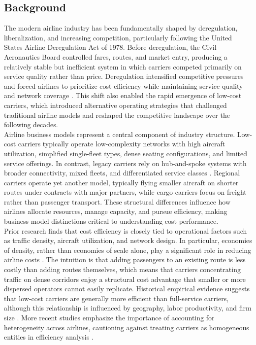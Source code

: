 \documentclass[11pt, letterpaper]{article}
\begin{document}
\subsection{Background}
The modern airline industry has been fundamentally shaped by deregulation, liberalization, and increasing competition, particularly following the United States Airline Deregulation Act of 1978. Before deregulation, the Civil Aeronautics Board controlled fares, routes, and market entry, producing a relatively stable but inefficient system in which carriers competed primarily on service quality rather than price. Deregulation intensified competitive pressures and forced airlines to prioritize cost efficiency while maintaining service quality and network coverage \cite{Borenstein1992,Gillen2005}. This shift also enabled the rapid emergence of low-cost carriers, which introduced alternative operating strategies that challenged traditional airline models and reshaped the competitive landscape over the following decades.\\
\indent Airline business models represent a central component of industry structure. Low-cost carriers typically operate low-complexity networks with high aircraft utilization, simplified single-fleet types, dense seating configurations, and limited service offerings. In contrast, legacy carriers rely on hub-and-spoke systems with broader connectivity, mixed fleets, and differentiated service classes \cite{Barbot2008,Gillen2005,OConnell2005}. Regional carriers operate yet another model, typically flying smaller aircraft on shorter routes under contracts with major partners, while cargo carriers focus on freight rather than passenger transport. These structural differences influence how airlines allocate resources, manage capacity, and pursue efficiency, making business model distinctions critical to understanding cost performance.\\
\indent Prior research finds that cost efficiency is closely tied to operational factors such as traffic density, aircraft utilization, and network design. In particular, economies of density, rather than economies of scale alone, play a significant role in reducing airline costs \cite{Caves1984,Zuidberg2014}. The intuition is that adding passengers to an existing route is less costly than adding routes themselves, which means that carriers concentrating traffic on dense corridors enjoy a structural cost advantage that smaller or more dispersed operators cannot easily replicate. Historical empirical evidence suggests that low-cost carriers are generally more efficient than full-service carriers, although this relationship is influenced by geography, labor productivity, and firm size \cite{Barbot2008}. More recent studies emphasize the importance of accounting for heterogeneity across airlines, cautioning against treating carriers as homogeneous entities in efficiency analysis \cite{Li2025}.\\
\end{document}
